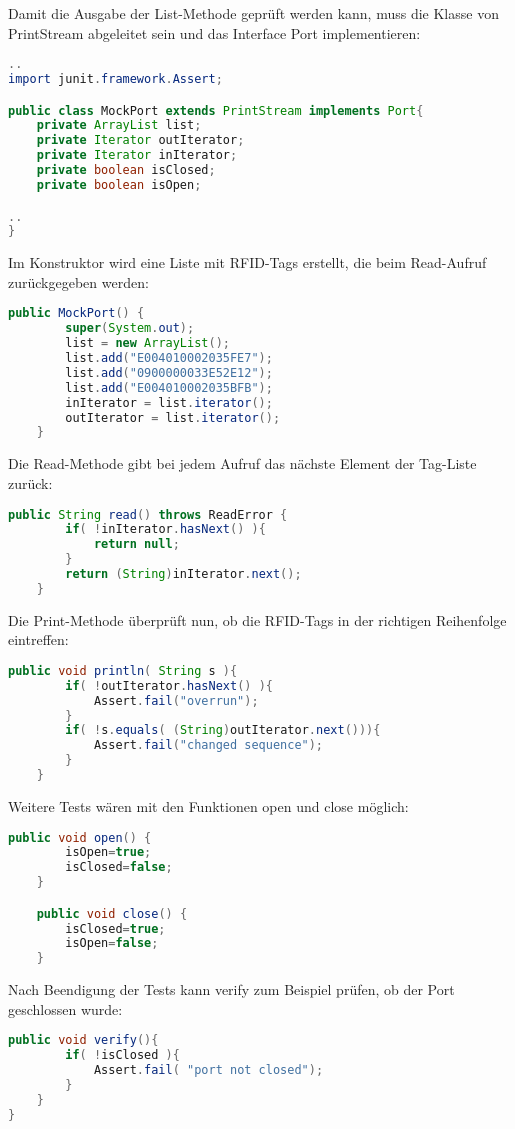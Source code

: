\newslide
Damit die Ausgabe der List-Methode geprüft werden kann, muss
die Klasse von PrintStream abgeleitet sein und das Interface Port
implementieren:
\begin{lstlisting}[language=java]
..
import junit.framework.Assert;

public class MockPort extends PrintStream implements Port{
    private ArrayList list;
    private Iterator outIterator;
    private Iterator inIterator;
    private boolean isClosed;
    private boolean isOpen;

..
}
\end{lstlisting}
\newslide
Im Konstruktor wird eine Liste mit RFID-Tags erstellt, die
beim Read-Aufruf zurückgegeben werden:
\begin{lstlisting}[language=java]
public MockPort() {
        super(System.out);
        list = new ArrayList();
        list.add("E004010002035FE7");
        list.add("0900000033E52E12");
        list.add("E004010002035BFB");
        inIterator = list.iterator();
        outIterator = list.iterator();
    }
\end{lstlisting}
\newslide
Die Read-Methode gibt bei jedem Aufruf das nächste Element der
Tag-Liste
zurück:
\begin{lstlisting}[language=java]
  public String read() throws ReadError {
        if( !inIterator.hasNext() ){
            return null;
        }
        return (String)inIterator.next();
    }
  \end{lstlisting}
\newslide
Die Print-Methode überprüft nun, ob die RFID-Tags in der richtigen
Reihenfolge eintreffen:
\begin{lstlisting}[language=java]
  public void println( String s ){
        if( !outIterator.hasNext() ){
            Assert.fail("overrun");
        }
        if( !s.equals( (String)outIterator.next())){
            Assert.fail("changed sequence");
        }
    }
  \end{lstlisting}
\newslide
Weitere Tests wären mit den Funktionen open und close möglich:
\begin{lstlisting}[language=java]
  public void open() {
        isOpen=true;
        isClosed=false;
    }

    public void close() {
        isClosed=true;
        isOpen=false;
    }
  \end{lstlisting}
\newslide
Nach Beendigung der Tests kann verify zum Beispiel prüfen, ob
der Port geschlossen wurde:
\begin{lstlisting}[language=java]
public void verify(){
        if( !isClosed ){
            Assert.fail( "port not closed");
        }
    }
}
\end{lstlisting}
